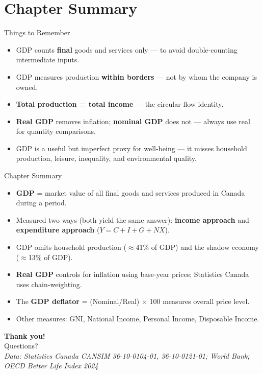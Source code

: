 \documentclass[aspectratio=169]{beamer}
\begin{document}
\section*{Chapter Summary}

\begin{frame}{Things to Remember}
\transfade
\begin{itemize}
  \item GDP counts \textbf{final} goods and services only --- to avoid double-counting intermediate inputs.
  \item GDP measures production \textbf{within borders} --- not by whom the company is owned.
  \item \textbf{Total production = total income} --- the circular-flow identity.
  \item \textbf{Real GDP} removes inflation; \textbf{nominal GDP} does not --- always use real for quantity comparisons.
  \item GDP is a useful but imperfect proxy for well-being --- it misses household production, leisure, inequality, and environmental quality.
\end{itemize}
\end{frame}

\begin{frame}{Chapter Summary}
\transfade
\begin{itemize}
  \item \textbf{GDP} = market value of all final goods and services produced in Canada during a period.
  \item Measured two ways (both yield the same answer): \textbf{income approach} and \textbf{expenditure approach} ($Y = C + I + G + NX$).
  \item GDP omits household production ($\approx$41\% of GDP) and the shadow economy ($\approx$13\% of GDP).
  \item \textbf{Real GDP} controls for inflation using base-year prices; Statistics Canada uses chain-weighting.
  \item The \textbf{GDP deflator} = (Nominal/Real) $\times$ 100 measures overall price level.
  \item Other measures: GNI, National Income, Personal Income, Disposable Income.
\end{itemize}
\end{frame}

\begin{frame}
\centering
\Huge \textbf{Thank you!}\\[1em]
\normalsize Questions?\\[0.5em]
\small\itshape Data: Statistics Canada CANSIM 36-10-0104-01, 36-10-0121-01; World Bank; OECD Better Life Index 2024
\end{frame}
\end{document}
